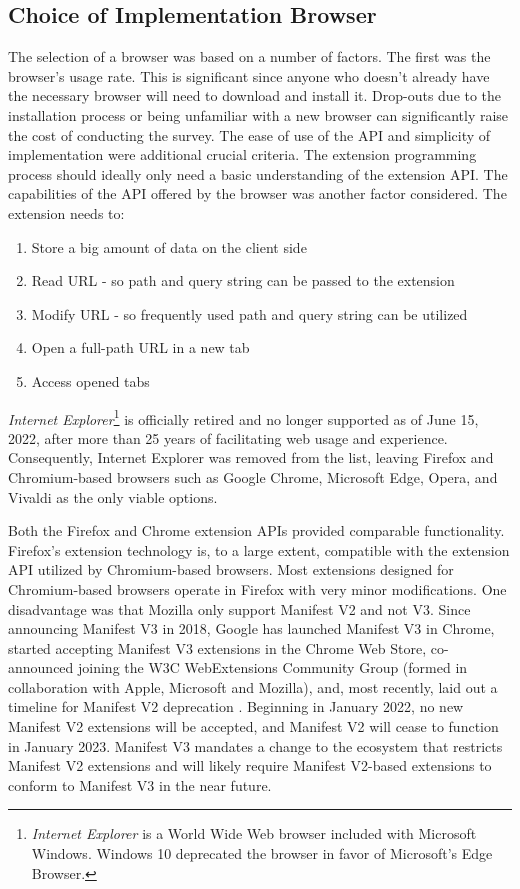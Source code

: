 \subsection{Choice of Implementation Browser}
The selection of a browser was based on a number of factors. The first was the browser's usage rate. This is significant since anyone who doesn't already have the necessary browser will need to download and install it. Drop-outs due to the installation process or being unfamiliar with a new browser can significantly raise the cost of conducting the survey. The ease of use of the API and simplicity of implementation were additional crucial criteria. The extension programming process should ideally only need a basic understanding of the extension API. The capabilities of the API offered by the browser was another factor considered. The extension needs to:

\begin{enumerate}
  \item Store a big amount of data on the client side
  \item Read URL - so path and query string can be passed to the extension
  \item Modify URL - so frequently used path and query string can be utilized
  \item Open a full-path URL in a new tab
  \item Access opened tabs
\end{enumerate}

\emph{Internet Explorer}\footnote{\emph{Internet Explorer} is a World Wide Web browser included with Microsoft Windows. Windows 10 deprecated the browser in favor of Microsoft's Edge Browser.} is officially retired and no longer supported as of June 15, 2022, after more than 25 years of facilitating web usage and experience. Consequently, Internet Explorer was removed from the list, leaving Firefox and Chromium-based browsers such as Google Chrome, Microsoft Edge, Opera, and Vivaldi as the only viable options.

Both the Firefox and Chrome extension APIs provided comparable functionality. Firefox's extension technology is, to a large extent, compatible with the extension API utilized by Chromium-based browsers. Most extensions designed for Chromium-based browsers operate in Firefox with very minor modifications. One disadvantage was that Mozilla only support Manifest V2 and not V3. Since announcing Manifest V3 in 2018, Google has launched Manifest V3 in Chrome, started accepting Manifest V3 extensions in the Chrome Web Store, co-announced joining the W3C WebExtensions Community Group (formed in collaboration with Apple, Microsoft and Mozilla), and, most recently, laid out a timeline for Manifest V2 deprecation \autocite{alexei2021manifest}. Beginning in January 2022, no new Manifest V2 extensions will be accepted, and Manifest V2 will cease to function in January 2023. Manifest V3 mandates a change to the ecosystem that restricts Manifest V2 extensions and will likely require Manifest V2-based extensions to conform to Manifest V3 in the near future.

